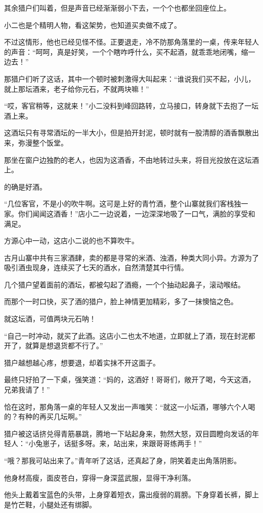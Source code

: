 \begin{this_body}
其余猎户们叫着，但是声音已经渐渐弱小下去，一个个也都坐回座位上。

小二也是个精明人物，看这架势，也知道买卖做不成了。

不过这情形，他也已经见怪不怪。正要退走，冷不防那角落里的一桌，传来年轻人的声音：“呵呵，真是好笑，一个个瞎咋呼什么，买不起酒，就乖乖地闭嘴，缩一边去！”

那猎户们听了这话，其中一个顿时被刺激得大叫起来：“谁说我们买不起，小儿，就上那坛酒来，老子给你元石，不就两块嘛！”

“哎，客官稍等，这就来！”小二没料到峰回路转，立马接口，转身就下去抱了一坛酒上来。

这酒坛只有寻常酒坛的一半大小，但是拍开封泥，顿时就有一股清醇的酒香飘散出来，弥漫整个饭堂。

那坐在窗户边独酌的老人，也因为这酒香，不由地转过头来，将目光投放在这坛酒上。

的确是好酒。

“几位客官，不是小的吹牛啊。这可是上好的青竹酒，整个山寨就我们客栈独一家。你们闻闻这酒香！”店小二一边说着，一边深深地吸了一口气，满脸的享受和满足。

方源心中一动，这店小二说的也不算吹牛。

古月山寨中共有三家酒肆，卖的都是寻常的米酒、浊酒，种类大同小异。方源为了吸引酒虫现身，连续买了七天的酒水，自然清楚其中行情。

几个猎户望着面前的酒坛，都被勾起了酒瘾，一个个抽动起鼻子，滚动喉结。

而那个一时口快，买了酒的猎户，脸上神情更加精彩，多了一抹懊恼之色。

就这坛酒，可值两块元石呐！

“自己一时冲动，就买了此酒。这店小二也太不地道，立即就上了酒，现在封泥都开了，就算是想退货都不行了。”

猎户越想越心疼，想要退，却着实抹不开这面子。

最终只好拍了一下桌，强笑道：“妈的，这酒好！哥哥们，敞开了喝，今天这酒，兄弟我请了！”

恰在这时，那角落一桌的年轻人又发出一声嗤笑：“就这一小坛酒，哪够六个人喝的？有种的再买几坛啊。”

猎户被这话挤兑得青筋暴跳，腾地一下站起身来，勃然大怒，双目圆瞪向发话的年轻人：“小兔崽子，话挺多呀。来，站出来，来跟哥哥练两手！”

“哦？那我可站出来了。”青年听了这话，还真起了身，阴笑着走出角落阴影。

他身材高瘦，面皮苍白，穿得一身深蓝武服，显得干净利落。

他头上戴着宝蓝色的头带，上身穿着短衣，露出瘦弱的肩膀。下身穿着长裤，脚上是竹芒鞋，小腿处还有绑脚。


\end{this_body}
